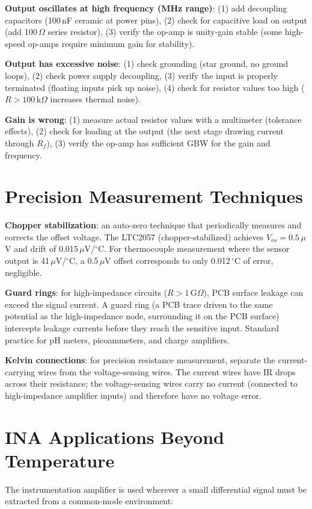 \documentclass[11pt,letterpaper,twoside,openany]{book}
\newcommand{\degC}{\ensuremath{{}^{\circ}\text{C}}}
\begin{document}
\textbf{Output oscillates at high frequency (MHz range)}: (1) add decoupling capacitors (100\,nF ceramic at power pins), (2) check for capacitive load on output (add 100\,$\Omega$ series resistor), (3) verify the op-amp is unity-gain stable (some high-speed op-amps require minimum gain for stability).

\textbf{Output has excessive noise}: (1) check grounding (star ground, no ground loops), (2) check power supply decoupling, (3) verify the input is properly terminated (floating inputs pick up noise), (4) check for resistor values too high ($R > 100$\,k$\Omega$ increases thermal noise).

\textbf{Gain is wrong}: (1) measure actual resistor values with a multimeter (tolerance effects), (2) check for loading at the output (the next stage drawing current through $R_f$), (3) verify the op-amp has sufficient GBW for the gain and frequency.

\section{Precision Measurement Techniques}
\textbf{Chopper stabilization}: an auto-zero technique that periodically measures and corrects the offset voltage. The LTC2057 (chopper-stabilized) achieves $V_{os} = 0.5\,\mu$V and drift of 0.015\,$\mu$V/\degC{}. For thermocouple measurement where the sensor output is 41\,$\mu$V/\degC{}, a 0.5\,$\mu$V offset corresponds to only 0.012\,\degC{} of error, negligible.

\textbf{Guard rings}: for high-impedance circuits ($R > 1$\,G$\Omega$), PCB surface leakage can exceed the signal current. A guard ring (a PCB trace driven to the same potential as the high-impedance node, surrounding it on the PCB surface) intercepts leakage currents before they reach the sensitive input. Standard practice for pH meters, picoammeters, and charge amplifiers.

\textbf{Kelvin connections}: for precision resistance measurement, separate the current-carrying wires from the voltage-sensing wires. The current wires have IR drops across their resistance; the voltage-sensing wires carry no current (connected to high-impedance amplifier inputs) and therefore have no voltage error.

\section{INA Applications Beyond Temperature}
The instrumentation amplifier is used wherever a small differential signal must be extracted from a common-mode environment:
\end{document}
